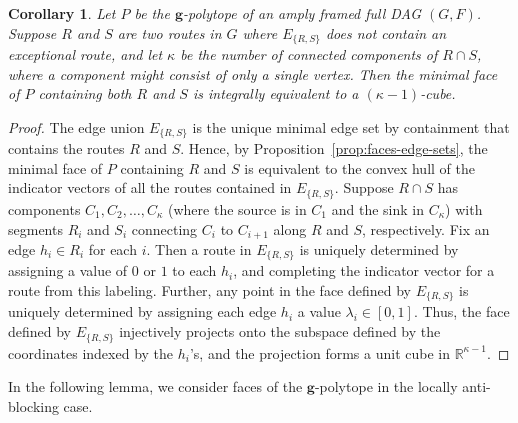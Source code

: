 \documentclass[12pt]{amsart}
\newtheorem{corollary}[theorem]{Corollary}
\theoremstyle{definition}
\newcommand\bg{\mathbf{g}}
\newcommand\R{\mathbb{R}}
\begin{document}
\begin{corollary}\label{cor:components-and-minimal-face}
    Let $P$ be the $\bg$-polytope of an amply framed full DAG $(G,F)$. Suppose $R$ and $S$ are two routes in $G$ where $E_{\{R,S\}}$ does not contain an exceptional route, and let $\kappa$ be the number of connected components of $R\cap S$, where a component might consist of only a single vertex. 
    Then the minimal face of $P$ containing both $R$ and $S$ is integrally equivalent to a $(\kappa-1)$-cube.
\end{corollary}
\begin{proof}
    The edge union $E_{\{R,S\}}$ is the unique minimal edge set by containment that contains the routes $R$ and $S$. Hence, by Proposition~\ref{prop:faces-edge-sets}, the minimal face of $P$ containing $R$ and $S$ is equivalent to the convex hull of the indicator vectors of all the routes contained in $E_{\{R,S\}}$. 
    Suppose $R\cap S$ has components $C_1,C_2,\ldots,C_\kappa$ (where the source is in $C_1$ and the sink in $C_{\kappa}$) with segments $R_i$ and $S_i$ connecting $C_i$ to $C_{i+1}$ along $R$ and $S$, respectively.
    Fix an edge $h_i\in R_i$ for each $i$.
    Then a route in $E_{\{R,S\}}$ is uniquely determined by assigning a value of $0$ or $1$ to each $h_i$, and completing the indicator vector for a route from this labeling.
    Further, any point in the face defined by $E_{\{R,S\}}$ is uniquely determined by assigning each edge $h_i$ a value $\lambda_i\in [0,1]$.
    Thus, the face defined by $E_{\{R,S\}}$ injectively projects onto the subspace defined by the coordinates indexed by the $h_i$'s, and the projection forms a unit cube in $\R^{\kappa-1}$.
\end{proof}

In the following lemma, we consider faces of the $\bg$-polytope in the locally anti-blocking case.
\end{document}
